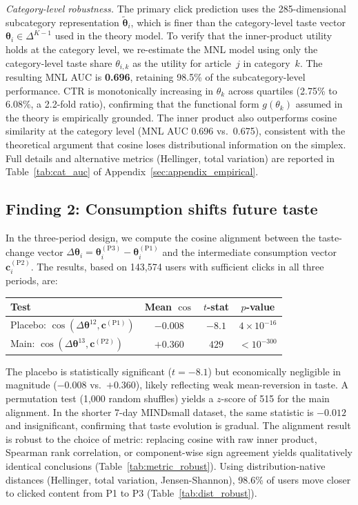 \documentclass[11pt]{article}
\begin{document}
\emph{Category-level robustness.} The primary click prediction uses the 285-dimensional subcategory representation $\tilde{\boldsymbol{\theta}}_i$, which is finer than the category-level taste vector $\boldsymbol{\theta}_i \in \Delta^{K-1}$ used in the theory model. To verify that the inner-product utility holds at the category level, we re-estimate the MNL model using only the category-level taste share $\theta_{i,k}$ as the utility for article~$j$ in category~$k$. The resulting MNL AUC is \textbf{0.696}, retaining 98.5\% of the subcategory-level performance. CTR is monotonically increasing in $\theta_k$ across quartiles (2.75\% to 6.08\%, a 2.2-fold ratio), confirming that the functional form $g(\theta_k)$ assumed in the theory is empirically grounded. The inner product also outperforms cosine similarity at the category level (MNL AUC 0.696 vs.\ 0.675), consistent with the theoretical argument that cosine loses distributional information on the simplex. Full details and alternative metrics (Hellinger, total variation) are reported in Table~\ref{tab:cat_auc} of Appendix~\ref{sec:appendix_empirical}.

\subsection{Finding 2: Consumption shifts future taste}

In the three-period design, we compute the cosine alignment between the taste-change vector $\Delta\boldsymbol{\theta}_i = \boldsymbol{\theta}_i^{(\text{P3})} - \boldsymbol{\theta}_i^{(\text{P1})}$ and the intermediate consumption vector $\mathbf{c}_i^{(\text{P2})}$. The results, based on 143,574 users with sufficient clicks in all three periods, are:

\begin{center}
\begin{tabular}{lccc}
\toprule
Test & Mean $\cos$ & $t$-stat & $p$-value \\
\midrule
Placebo: $\cos(\Delta\boldsymbol{\theta}^{12}, \mathbf{c}^{(\text{P1})})$ & $-0.008$ & $-8.1$ & $4 \times 10^{-16}$ \\
Main: $\cos(\Delta\boldsymbol{\theta}^{13}, \mathbf{c}^{(\text{P2})})$ & $+0.360$ & $429$ & $< 10^{-300}$ \\
\bottomrule
\end{tabular}
\end{center}

The placebo is statistically significant ($t = -8.1$) but economically negligible in magnitude ($-0.008$ vs.\ $+0.360$), likely reflecting weak mean-reversion in taste. A permutation test (1,000 random shuffles) yields a $z$-score of 515 for the main alignment. In the shorter 7-day MINDsmall dataset, the same statistic is $-0.012$ and insignificant, confirming that taste evolution is gradual. The alignment result is robust to the choice of metric: replacing cosine with raw inner product, Spearman rank correlation, or component-wise sign agreement yields qualitatively identical conclusions (Table~\ref{tab:metric_robust}). Using distribution-native distances (Hellinger, total variation, Jensen-Shannon), 98.6\% of users move closer to clicked content from P1 to P3 (Table~\ref{tab:dist_robust}).
\end{document}
